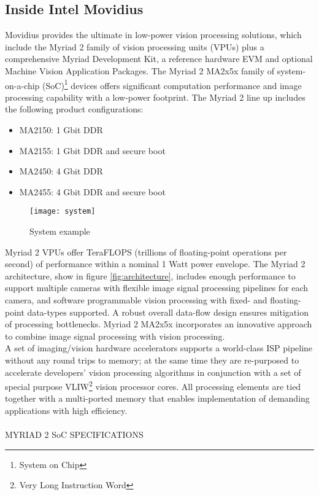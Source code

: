\subsection{Inside Intel Movidius}
\label{subsec:techspec}
Movidius provides the ultimate in low-power vision processing solutions, which 
include the Myriad 2 family of vision processing units (VPUs) plus a 
comprehensive Myriad Development Kit, a reference hardware EVM and 
optional Machine Vision Application Packages.
The Myriad 2 MA2x5x family of system-on-a-chip (SoC)\footnote{System on Chip} 
devices offers significant computation performance and image processing 
capability with a low-power footprint.
The Myriad 2 line up includes the following product configurations:
\begin{itemize}
	\item	MA2150: 1 Gbit DDR
	\item	MA2155: 1 Gbit DDR and secure boot 
	\item	MA2450: 4 Gbit DDR
	\item	MA2455: 4 Gbit DDR and secure boot
\end{itemize}
%
\begin{figure}[!h]
\centering
\texttt{[image: system]}
\caption{System example}
\label{fig:systemexample}
\end{figure}
% 
Myriad 2 VPUs offer TeraFLOPS (trillions of floating-point operations per 
second) of performance within a nominal 1 Watt power envelope. 
The Myriad 2 architecture, show in figure \ref{fig:architecture}, includes enough 
performance to support multiple cameras with flexible image signal processing 
pipelines for each camera, and software programmable vision processing with 
fixed- and floating-point data-types supported.
A robust overall data-flow design ensures mitigation of processing bottlenecks.
Myriad 2 MA2x5x incorporates an innovative approach to combine image signal 
processing with vision processing.\\ 
A set of imaging/vision hardware accelerators supports a world-class ISP pipeline 
without any round trips to memory; at the same time they are re-purposed to 
accelerate developers' vision processing algorithms in conjunction with a set of 
special purpose VLIW\footnote{Very Long Instruction Word} vision processor cores. 
All processing elements are tied together with a multi-ported memory that enables 
implementation of demanding applications with high efficiency.\cite{intel}\\
\\MYRIAD 2 SoC SPECIFICATIONS\\
